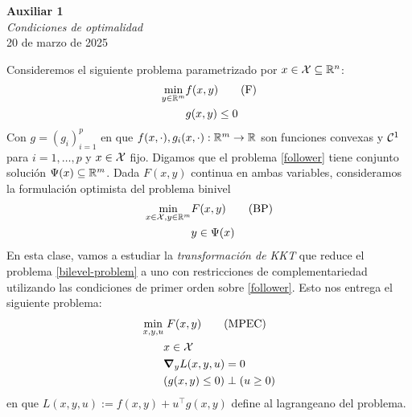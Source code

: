 \documentclass{article}
\begin{document}


\begin{center}
    \Huge{\textbf{Auxiliar 1}}\\
\textit{\large{Condiciones de optimalidad}}\\
    \normalsize
	20 de marzo de 2025
\end{center}

\noindent Consideremos el siguiente problema parametrizado por \(x \in \mathcal{X} \subseteq \mathbb{R}^n\):
\begin{align*} \label{follower}
	\min_{y \in \mathbb{R}^m} & f(x, y) \tag{F} \\
	& g(x, y) \leq 0
\end{align*}	
Con \(g = (g_i)_{i = 1}^p\) en que \(f(x, \cdot), g_i(x, \cdot) : \mathbb{R}^m \to \mathbb{R}\) son funciones convexas y \(\mathcal{C}^1\) para \(i = 1, \dots, p\) y \(x \in \mathcal{X}\) fijo. Digamos que el problema \ref{follower} tiene conjunto solución \(\Psi(x) \subseteq \mathbb{R}^m\). Dada \(F(x, y)\) continua en ambas variables, consideramos la formulación optimista del problema binivel
\begin{align*} \label{bilevel-problem}
	\min_{x \in \mathcal{X}, y \in \mathbb{R}^m}	& F(x, y) \tag{BP} \\
	& y \in \Psi(x)
\end{align*}
En esta clase, vamos a estudiar la \textit{transformación de KKT} que reduce el problema \ref{bilevel-problem} a uno con restricciones de complementariedad utilizando las condiciones de primer orden sobre \ref{follower}. Esto nos entrega el siguiente problema:
\begin{align*} \label{KKT-bilevel-problem}
	\min_{x, y, u} & \;F(x, y) \tag{MPEC} \\
				   & x \in \mathcal{X} \\
				   & \grad_y L(x, y, u) = 0 \\
				   & (g(x, y) \leq 0) \perp (u \geq 0)
\end{align*}
en que \(L(x, y, u) := f(x, y) + u^\top g(x, y)\) define al lagrangeano del problema.
\end{document}

